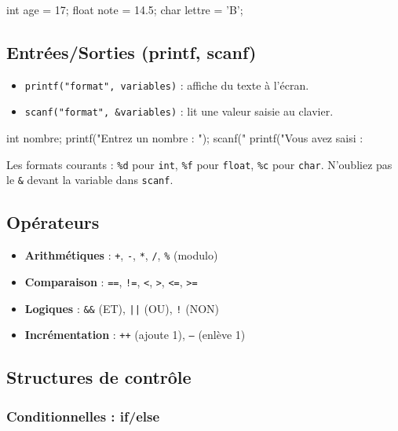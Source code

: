 \begin{ccode}
int age = 17;
float note = 14.5;
char lettre = 'B';
\end{ccode}

\subsection{Entrées/Sorties (printf, scanf)}

\begin{itemize}
    \item \texttt{printf("format", variables)} : affiche du texte à l'écran.
    \item \texttt{scanf("format", \&variables)} : lit une valeur saisie au clavier.
\end{itemize}

\begin{ccode}
int nombre;
printf("Entrez un nombre : ");
scanf("%
printf("Vous avez saisi : %
\end{ccode}

\begin{aretenir}
Les formats courants : \texttt{\%d} pour \texttt{int}, \texttt{\%f} pour \texttt{float}, \texttt{\%c} pour \texttt{char}. N'oubliez pas le \texttt{\&} devant la variable dans \texttt{scanf}.
\end{aretenir}

\subsection{Opérateurs}

\begin{itemize}
    \item \textbf{Arithmétiques} : \texttt{+}, \texttt{-}, \texttt{*}, \texttt{/}, \texttt{\%} (modulo)
    \item \textbf{Comparaison} : \texttt{==}, \texttt{!=}, \texttt{<}, \texttt{>}, \texttt{<=}, \texttt{>=}
    \item \textbf{Logiques} : \texttt{\&\&} (ET), \texttt{||} (OU), \texttt{!} (NON)
    \item \textbf{Incrémentation} : \texttt{++} (ajoute 1), \texttt{--} (enlève 1)
\end{itemize}

\subsection{Structures de contrôle}

\subsubsection{Conditionnelles : if/else}

